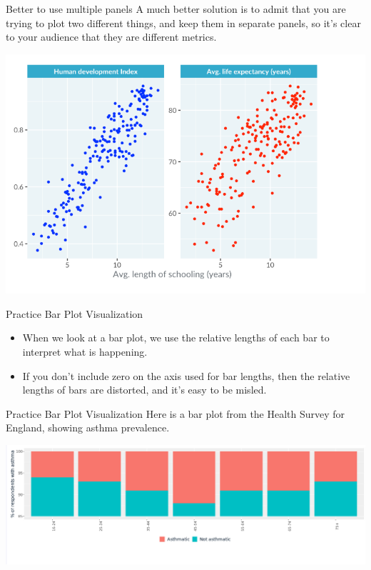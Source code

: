 \documentclass[
  ignorenonframetext,
]{beamer}
\begin{document}
\begin{frame}{Better to use multiple panels}
\label{better-to-use-multiple-panels}
A much better solution is to admit that you are trying to plot two
different things, and keep them in separate panels, so it's clear to
your audience that they are different metrics.

\includegraphics{../images/im110.png}
\end{frame}

\begin{frame}{Practice Bar Plot Visualization}
\label{practice-bar-plot-visualization}
\begin{itemize}
\item
  When we look at a bar plot, we use the relative lengths of each bar to
  interpret what is happening.
\item
  If you don't include zero on the axis used for bar lengths, then the
  relative lengths of bars are distorted, and it's easy to be misled.
\end{itemize}
\end{frame}

\begin{frame}{Practice Bar Plot Visualization}
\label{practice-bar-plot-visualization-1}
Here is a bar plot from the Health Survey for England, showing asthma
prevalence.

\includegraphics{../images/im111.png}
\end{frame}
\end{document}
